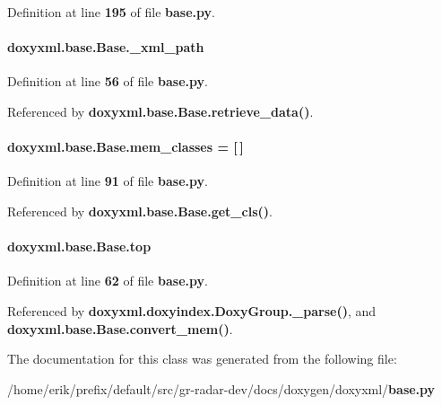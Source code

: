 Definition at line {\bf 195} of file {\bf base.\+py}.

\paragraph[{\+\_\+xml\+\_\+path}]{\setlength{\rightskip}{0pt plus 5cm}doxyxml.\+base.\+Base.\+\_\+xml\+\_\+path\hspace{0.3cm}{\ttfamily [private]}}\label{classdoxyxml_1_1base_1_1Base_ab099a57cbc446102c49392a3e35c9b26}


Definition at line {\bf 56} of file {\bf base.\+py}.



Referenced by {\bf doxyxml.\+base.\+Base.\+retrieve\+\_\+data()}.

\paragraph[{mem\+\_\+classes}]{ doxyxml.\+base.\+Base.\+mem\+\_\+classes = [$\,$]\hspace{0.3cm}{\ttfamily [static]}}\label{classdoxyxml_1_1base_1_1Base_a2697b46ff76fe9f021a8f6cf54972151}


Definition at line {\bf 91} of file {\bf base.\+py}.



Referenced by {\bf doxyxml.\+base.\+Base.\+get\+\_\+cls()}.

\paragraph[{top}]{\setlength{\rightskip}{0pt plus 5cm}doxyxml.\+base.\+Base.\+top}\label{classdoxyxml_1_1base_1_1Base_a30ba38f66851411e029bace653f56f84}


Definition at line {\bf 62} of file {\bf base.\+py}.



Referenced by {\bf doxyxml.\+doxyindex.\+Doxy\+Group.\+\_\+parse()}, and {\bf doxyxml.\+base.\+Base.\+convert\+\_\+mem()}.



The documentation for this class was generated from the following file\+:\begin{DoxyCompactItemize}
\item 
/home/erik/prefix/default/src/gr-\/radar-\/dev/docs/doxygen/doxyxml/{\bf base.\+py}\end{DoxyCompactItemize}
